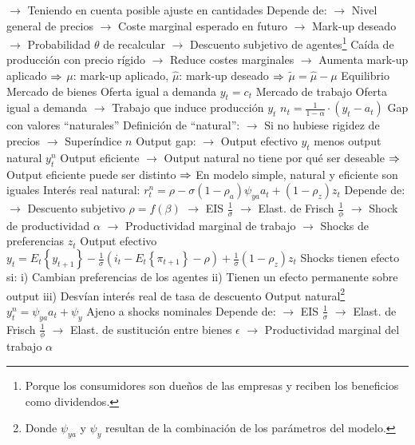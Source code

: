 \documentclass{nuevotema}
\begin{document}
\begin{esquemal}
				\4[] $\to$ Teniendo en cuenta posible ajuste en cantidades
				\4[] Depende de:
				\4[] $\to$ Nivel general de precios
				\4[] $\to$ Coste marginal esperado en futuro
				\4[] $\to$ Mark-up deseado
				\4[] $\to$ Probabilidad $\theta$ de recalcular
				\4[] $\to$ Descuento subjetivo de agentes\footnote{Porque los consumidores son dueños de las empresas y reciben los beneficios como dividendos.}
				\4[] Caída de producción con precio rígido
				\4[] $\to$ Reduce costes marginales
				\4[] $\to$ Aumenta mark-up aplicado
				\4[] $\Rightarrow$ $\mu$: mark-up aplicado, $\hat{\mu}$: mark-up deseado
				\4[] $\Rightarrow$ $\tilde{\mu} = \hat{\mu} - \mu$
				\4[] 
			\3 Equilibrio
				\4 Mercado de bienes
				\4[] Oferta igual a demanda
				\4[] $y_t = c_t$
				\4 Mercado de trabajo
				\4[] Oferta igual a demanda
				\4[] $\to$ Trabajo que induce producción $y_t$
				\4[] $n_t = \frac{1}{1-\alpha} \cdot (y_t - a_t)$
				\4 Gap con valores ``naturales''
				\4[] Definición de ``natural'':
				\4[] $\to$ Si no hubiese rigidez de precios
				\4[] $\to$ Superíndice $n$
				\4[] Output gap:
				\4[] $\to$ Output efectivo $y_t$ menos output natural $y_t^n$
				\4[] Output eficiente
				\4[] $\to$ Output natural no tiene por qué ser deseable
				\4[] $\Rightarrow$ Output eficiente puede ser distinto
				\4[] $\Rightarrow$ En modelo simple, natural y eficiente son iguales
				\4 Interés real natural:
				\4[] $r_t^n = \rho - \sigma(1-\rho_a) \psi_{ya} a_t + (1-\rho_z) z_t$
				\4[] Depende de:
				\4[] $\to$ Descuento subjetivo $\rho = f(\beta)$
				\4[] $\to$ EIS $\frac{1}{\sigma}$
				\4[] $\to$ Elast. de Frisch $\frac{1}{\phi}$
				\4[] $\to$ Shock de productividad $\alpha$
				\4[] $\to$ Productividad marginal de trabajo
				\4[] $\to$ Shocks de preferencias $z_t$
				\4 Output efectivo
				\4[] $y_t = E_t \left\lbrace y_{t+1} \right\rbrace - \frac{1}{\sigma} \left( i_t - E_t \left\lbrace \pi_{t+1} \right\rbrace - \rho \right) + \frac{1}{\sigma} (1-\rho_z) z_t$
				\4[] Shocks tienen efecto si:
				\4[] i) Cambian preferencias de los agentes
				\4[] ii) Tienen un efecto permanente sobre output
				\4[] iii) Desvían interés real de tasa de descuento
				\4 Output natural\footnote{Donde $\psi_{ya}$ y $\psi_y$ resultan de la combinación de los parámetros del modelo.}
				\4[] $y_t^n = \psi_{ya} a_t + \psi_y$
				\4[] Ajeno a shocks nominales
				\4[] Depende de:
				\4[] $\to$ EIS $\frac{1}{\sigma}$
				\4[] $\to$ Elast. de Frisch $\frac{1}{\phi}$
				\4[] $\to$ Elast. de sustitución entre bienes $\epsilon$
				\4[] $\to$ Productividad marginal del trabajo $\alpha$

\end{esquemal}
\end{document}
